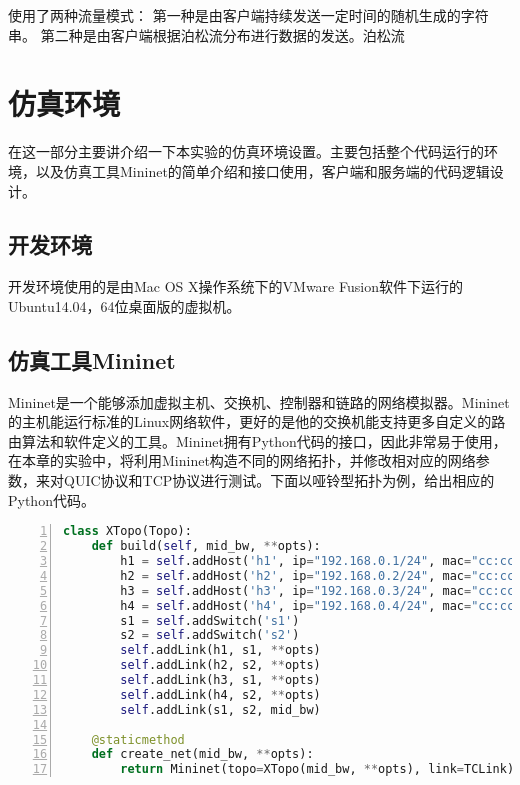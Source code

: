 使用了两种流量模式：
第一种是由客户端持续发送一定时间的随机生成的字符串。
第二种是由客户端根据泊松流分布进行数据的发送。泊松流

\section{仿真环境}
在这一部分主要讲介绍一下本实验的仿真环境设置。主要包括整个代码运行的环境，以及仿真工具Mininet的简单介绍和接口使用，客户端和服务端的代码逻辑设计。
\subsection{开发环境}
开发环境使用的是由Mac OS X操作系统下的VMware Fusion软件下运行的Ubuntu14.04，64位桌面版的虚拟机。

\subsection{仿真工具Mininet}
Mininet是一个能够添加虚拟主机、交换机、控制器和链路的网络模拟器。Mininet的主机能运行标准的Linux网络软件，更好的是他的交换机能支持更多自定义的路由算法和软件定义的工具。Mininet拥有Python代码的接口，因此非常易于使用，在本章的实验中，将利用Mininet构造不同的网络拓扑，并修改相对应的网络参数，来对QUIC协议和TCP协议进行测试。下面以哑铃型拓扑为例，给出相应的Python代码。

\begin{lstlisting}[language={python},numbers=left]
class XTopo(Topo):
    def build(self, mid_bw, **opts):
        h1 = self.addHost('h1', ip="192.168.0.1/24", mac="cc:cc:cc:cc:cc:01")
        h2 = self.addHost('h2', ip="192.168.0.2/24", mac="cc:cc:cc:cc:cc:02")
        h3 = self.addHost('h3', ip="192.168.0.3/24", mac="cc:cc:cc:cc:cc:03")
        h4 = self.addHost('h4', ip="192.168.0.4/24", mac="cc:cc:cc:cc:cc:04")
        s1 = self.addSwitch('s1')
        s2 = self.addSwitch('s2')
        self.addLink(h1, s1, **opts)
        self.addLink(h2, s2, **opts)
        self.addLink(h3, s1, **opts)
        self.addLink(h4, s2, **opts)
        self.addLink(s1, s2, mid_bw)

    @staticmethod
    def create_net(mid_bw, **opts):
        return Mininet(topo=XTopo(mid_bw, **opts), link=TCLink)
\end{lstlisting}

